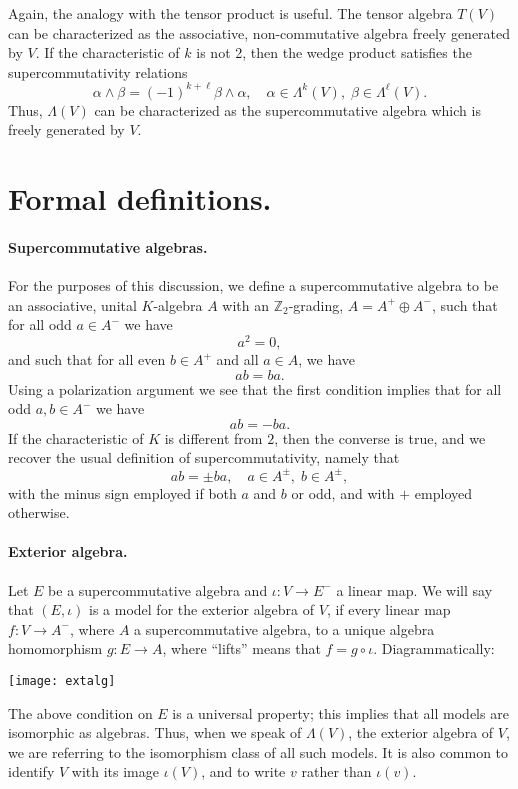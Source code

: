 \documentclass[12pt]{article}
\newcommand{\Zset}{\mathbb{Z}}
\begin{document}
Again, the analogy with the tensor product is useful.  The tensor
algebra $T(V)$ can be characterized as the associative,
non-commutative algebra freely generated by $V$.  If the
characteristic of $k$ is not 2, then the wedge product satisfies the
supercommutativity relations
\[ \alpha\wedge \beta = (-1)^{k+\ell} \beta\wedge\alpha,\quad
\alpha\in\Lambda^k(V),\; \beta\in\Lambda^\ell(V).\] Thus, $\Lambda(V)$
can be characterized as the supercommutative algebra which is freely
generated by $V$.

\section{Formal definitions.}
\paragraph{Supercommutative algebras.}
For the purposes of this discussion, we define a supercommutative
algebra to  be an associative, unital $K$-algebra $A$ with an
$\Zset_2$-grading, $A=A^+\oplus A^-$, such that for all odd 
$a\in A^-$ we have
\[ a^2 = 0, \]
and such that for all even $b\in A^+$ and all $a\in A$, we have
\[ ab = ba.\] Using a polarization argument we see that the first
condition implies that for all odd $a,b\in A^-$ we have
\[ ab = -ba.\]
If the characteristic of $K$ is different from $2$, then the converse
is true, and we recover the usual definition of supercommutativity,
namely that
\[ ab = \pm ba,\quad a\in A^{\pm},\; b\in A^{\pm},\]
with the minus sign employed if both $a$ and $b$ or odd, and with $+$
employed otherwise.

\paragraph{Exterior algebra.}
Let $E$ be a supercommutative algebra and $\iota:V\to E^-$ a linear
map.  We will say that $(E,\iota)$ is a model for the exterior algebra
of $V$, if every linear map $f:V\to A^-$, where $A$ a supercommutative
algebra,  to a unique algebra homomorphism $g:E\to A$, where
``lifts'' means that $f = g\circ\iota$.
Diagrammatically:
 \begin{center}
   \texttt{[image: extalg]}
\end{center}
The above condition on $E$ is a universal property; this implies that
all models are isomorphic as algebras.  Thus, when we speak of
$\Lambda(V)$, the exterior algebra of $V$, we are referring to the
isomorphism class of all such models.  It is also common to identify
$V$ with its image $\iota(V)$, and to write $v$ rather than
$\iota(v)$.
\end{document}
